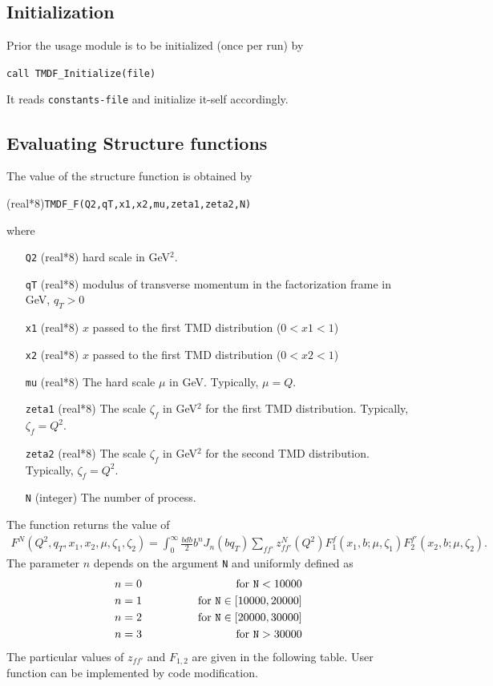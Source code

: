 \documentclass[prd,nofootinbib,eqsecnum,final]{revtex4}
\renewcommand{\(}{\left(}
\renewcommand{\)}{\right)}
\renewcommand{\[}{\left[}
\renewcommand{\]}{\right]}
\begin{document}
\subsection{Initialization}
\label{TMDF:init}

Prior the usage module is to be initialized (once per run) by

\texttt{call TMDF{\_}Initialize(file)}

It reads \texttt{constants-file} and initialize it-self accordingly.

\subsection{Evaluating Structure functions}
\label{TMDF:TMDF}

The value of the structure function is obtained by

(real*8)\texttt{TMDF{\_}F(Q2,qT,x1,x2,mu,zeta1,zeta2,N)}

where 
\begin{itemize}
\item [\texttt{Q2}] (real*8) hard scale in GeV$^2$.
\item [\texttt{qT}] (real*8) modulus of transverse momentum in the factorization frame in GeV, $q_T>0$
\item [\texttt{x1}] (real*8) $x$ passed to the first TMD distribution  ($0<x1<1$)
\item [\texttt{x2}] (real*8) $x$ passed to the first TMD distribution ($0<x2<1$)
\item [\texttt{mu}] (real*8) The hard scale $\mu$ in GeV. Typically, $\mu=Q$.
\item [\texttt{zeta1}] (real*8) The scale $\zeta_f$ in GeV$^2$ for the first TMD distribution. Typically, $\zeta_f=Q^2$.
\item [\texttt{zeta2}] (real*8) The scale $\zeta_f$ in GeV$^2$ for the second TMD distribution. Typically, $\zeta_f=Q^2$.
\item [\texttt{N}] (integer) The number of process.
\end{itemize}
The function returns the value of 
\begin{eqnarray}
F^N(Q^2,q_T,x_1,x_2,\mu,\zeta_1,\zeta_2)=\int_0^\infty \frac{bdb}{2}b^n J_n(bq_T)\sum_{ff'} z^N_{ff'}(Q^2) F_1^f(x_1,b;\mu,\zeta_1)F_2^{f'}(x_2,b;\mu,\zeta_2).
\end{eqnarray}
The parameter $n$ depends on the argument \texttt{N} and uniformly defined as 
\begin{eqnarray*}
n=0 &\qquad\qquad& \text{for \texttt{N}}<10000
\\
n=1 &\qquad\qquad& \text{for \texttt{N}}\in[10000,20000]
\\
n=2 &\qquad\qquad& \text{for \texttt{N}}\in[20000,30000]
\\
n=3 &\qquad\qquad& \text{for \texttt{N}}>30000
\end{eqnarray*}
The particular values of $z_{ff'}$ and $F_{1,2}$ are given in the following table. User function can be implemented by code modification.
\end{document}
